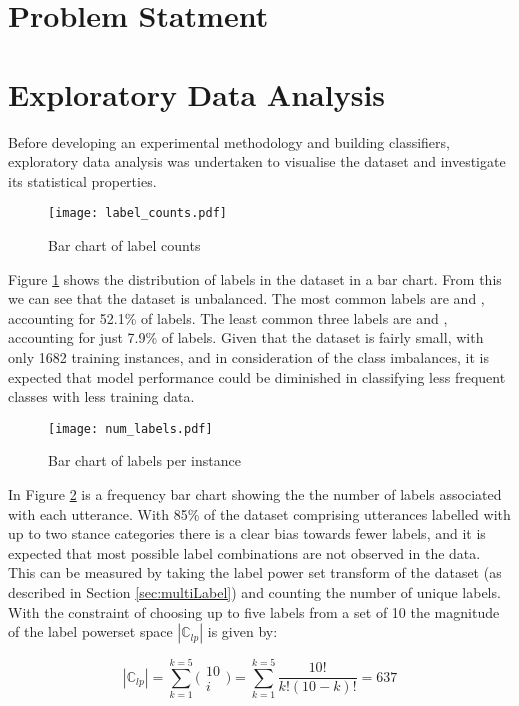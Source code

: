 \documentclass[Dissertation.tex]{subfiles}
\begin{document}
\section{Problem Statment}

\section{Exploratory Data Analysis} \label{sec:EDA}
Before developing an experimental methodology and building classifiers, exploratory data analysis was undertaken to visualise the dataset and investigate its statistical properties.


\begin{figure}
	\centering
	\texttt{[image: label\_counts.pdf]}
	\caption{Bar chart of label counts}
	\label{fig:labelBarChart}
\end{figure}

Figure \ref{fig:labelBarChart} shows the distribution of labels in the dataset in a bar chart. From this we can see that the dataset is unbalanced. The most common labels are  and , accounting for 52.1\% of labels.  The least common three labels are  and , accounting for just 7.9\% of labels.  Given that the dataset is fairly small, with only 1682 training instances, and in consideration of the class imbalances, it is expected that model performance could be diminished in classifying less frequent classes with less training data.


\begin{figure}
	\centering
	\texttt{[image: num\_labels.pdf]}
	\caption{Bar chart of labels per instance}
	\label{fig:numLabels}
\end{figure}

In Figure \ref{fig:numLabels} is a frequency bar chart showing the  the number of labels associated with each utterance. With 85\% of the dataset comprising utterances labelled with up to two stance categories there is a clear bias towards fewer labels, and it is expected that most possible label combinations are not observed in the data. This can be measured by taking the label power set transform of the dataset (as described in Section \ref{sec:multiLabel}) and counting the number of unique labels. With the constraint of choosing up to five labels from a set of 10 the magnitude of the label powerset space $ |\mathbb{C}_{lp}| $ is given by:

\[ |\mathbb{C}_{lp}| = \sum_{k=1}^{k=5}\bigg( 		\begin{array}{c}
10\\
i
\end{array} \bigg) = \sum_{k=1}^{k=5}\frac{10!}{k!(10-k)!} = 637 \]
\end{document}
